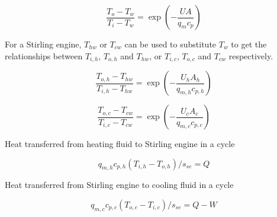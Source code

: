 \begin{equation}
	\frac{T_o-T_w}{T_i-T_w}=\exp(-\frac{UA}{q_mc_p})
\end{equation}


%
%

For a Stirling engine, $T_{hw}$ or $T_{cw}$ can be used to substitute $T_w$ to get the relationships between $T_{i,h}$, $T_{o,h}$ and $T_{hw}$, or $T_{i,c}$, $T_{o,c}$ and $T_{cw}$ respectively.

\begin{equation}
	\frac{T_{o,h}-T_{hw}}{T_{i,h}-T_{hw}}=\exp(-\frac{U_hA_h}{q_{m,h}c_{p,h}})
	\label{Eq:T_h}
\end{equation}

\begin{equation}
	\frac{T_{o,c}-T_{cw}}{T_{i,c}-T_{cw}}=\exp(-\frac{U_cA_c}{q_{m,c}c_{p,c}})
	\label{Eq:T_c}
\end{equation}

Heat transferred from heating fluid to Stirling engine in a cycle

\begin{equation}
	q_{m,h}c_{p,h}(T_{i,h}-T_{o,h})/s_{se} = Q
	\label{Eq:q_h}
\end{equation}

Heat transferred from Stirling engine to cooling fluid in a cycle

\begin{equation}
	q_{m,c}c_{p,c}(T_{o,c}-T_{i,c})/s_{se} = Q - W
	\label{Eq:q_c}
\end{equation}


